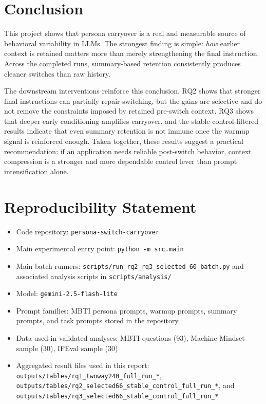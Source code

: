 \documentclass[11pt]{article}
\begin{document}
\section{Conclusion}

This project shows that persona carryover is a real and measurable source of behavioral variability in LLMs.
The strongest finding is simple: \emph{how} earlier context is retained matters more than merely strengthening the final instruction.
Across the completed runs, summary-based retention consistently produces cleaner switches than raw history.

The downstream interventions reinforce this conclusion.
RQ2 shows that stronger final instructions can partially repair switching, but the gains are selective and do not remove the constraints imposed by retained pre-switch context.
RQ3 shows that deeper early conditioning amplifies carryover, and the stable-control-filtered results indicate that even summary retention is not immune once the warmup signal is reinforced enough.
Taken together, these results suggest a practical recommendation: if an application needs reliable post-switch behavior, context compression is a stronger and more dependable control lever than prompt intensification alone.

\section*{Reproducibility Statement}

\begin{itemize}[leftmargin=*]
    \item Code repository: \texttt{persona-switch-carryover}
    \item Main experimental entry point: \texttt{python -m src.main}
    \item Main batch runners: \texttt{scripts/run\_rq2\_rq3\_selected\_60\_batch.py} and associated analysis scripts in \texttt{scripts/analysis/}
    \item Model: \texttt{gemini-2.5-flash-lite}
    \item Prompt families: MBTI persona prompts, warmup prompts, summary prompts, and task prompts stored in the repository
    \item Data used in validated analyses: MBTI questions (93), Machine Mindset sample (30), IFEval sample (30)
    \item Aggregated result files used in this report: \texttt{outputs/tables/rq1\_twoway240\_full\_run\_*}, \texttt{outputs/tables/rq2\_selected66\_stable\_control\_full\_run\_*}, and \texttt{outputs/tables/rq3\_selected66\_stable\_control\_full\_run\_*}
\end{itemize}
\end{document}
